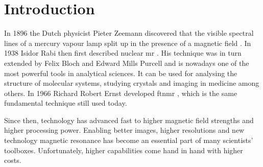 \setchapterpreamble[u]{\margintoc\hfil}
\chapter{Introduction}


In 1896 the Dutch physicist Pieter Zeemann discovered that the visible spectral lines of a mercury vapour lamp split up in the presence of a magnetic field . In 1938 Isidor Rabi then first described nuclear \acrfull{mr} . His technique was in turn extended by Felix Bloch  and Edward Mills Purcell  and is nowadays one of the most powerful tools in analytical sciences. It can be used for analysing the structure of molecular systems, studying crystals and imaging in medicine among others. In 1966 Richard Robert Ernst developed \acrfull{ftnmr} , which is the same fundamental technique still used today.

Since then, technology has advanced fast to higher magnetic field strengths and higher processing power. Enabling better images, higher resolutions and new technology magnetic resonance has become an essential part of many scientists' toolboxes. Unfortunately, higher capabilities come hand in hand with higher costs.

